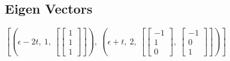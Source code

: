 \documentclass[11pt]{article}
\begin{document}
    \subsection{Eigen Vectors}
    $\left[ \left( \epsilon - 2 t, \  1, \  \left[ \left[\begin{matrix}1\\1\\1\end{matrix}\right]\right]\right), \  \left( \epsilon + t, \  2, \  \left[ \left[\begin{matrix}-1\\1\\0\end{matrix}\right], \  \left[\begin{matrix}-1\\0\\1\end{matrix}\right]\right]\right)\right]$
    
\end{document}
